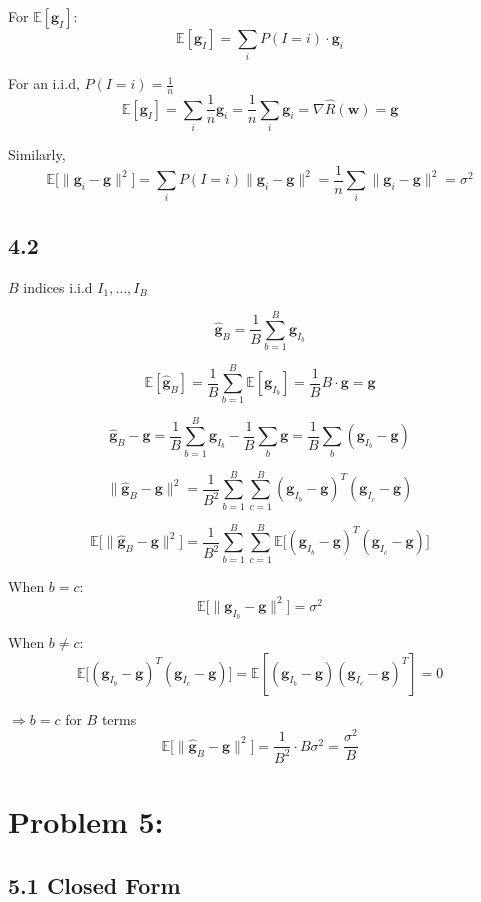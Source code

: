 \documentclass{article}
\begin{document}
For $\mathbb{E}[\mathbf{g}_I]$:
\[
\mathbb{E}[\mathbf{g}_I] = \sum_i P(I=i) \cdot \mathbf{g}_i
\]

For an i.i.d, $P(I=i) = \frac{1}{n}$
\[
\mathbb{E}[\mathbf{g}_I] = \sum_i \frac{1}{n} \mathbf{g}_i = \frac{1}{n}\sum_i \mathbf{g}_i = \nabla \hat{R}(\mathbf{w}) = \mathbf{g}
\]

Similarly,
\[
\mathbb{E}\big[\|\mathbf{g}_i - \mathbf{g}\|^2\big] = \sum_i P(I=i) \|\mathbf{g}_i - \mathbf{g}\|^2 = \frac{1}{n}\sum_i \|\mathbf{g}_i - \mathbf{g}\|^2 = \sigma^2
\]

\subsection*{4.2}

$B$ indices i.i.d $I_1, \ldots, I_B$

\[
\hat{\mathbf{g}}_B = \frac{1}{B}\sum_{b=1}^B \mathbf{g}_{I_b}
\]

\[
\mathbb{E}[\hat{\mathbf{g}}_B] = \frac{1}{B}\sum_{b=1}^B \mathbb{E}[\mathbf{g}_{I_b}] = \frac{1}{B} B \cdot \mathbf{g} = \mathbf{g}
\]

\[
\hat{\mathbf{g}}_B - \mathbf{g} = \frac{1}{B}\sum_{b=1}^B \mathbf{g}_{I_b} - \frac{1}{B}\sum_b \mathbf{g} = \frac{1}{B}\sum_b (\mathbf{g}_{I_b} - \mathbf{g})
\]

\[
\|\hat{\mathbf{g}}_B - \mathbf{g}\|^2 = \frac{1}{B^2}\sum_{b=1}^B \sum_{c=1}^B (\mathbf{g}_{I_b} - \mathbf{g})^T (\mathbf{g}_{I_c} - \mathbf{g})
\]

\[
\mathbb{E}\big[\|\hat{\mathbf{g}}_B - \mathbf{g}\|^2\big] = \frac{1}{B^2}\sum_{b=1}^B \sum_{c=1}^B \mathbb{E}\big[(\mathbf{g}_{I_b} - \mathbf{g})^T (\mathbf{g}_{I_c} - \mathbf{g})\big]
\]

When $b = c$:
\[
\mathbb{E}\big[\|\mathbf{g}_{I_b} - \mathbf{g}\|^2\big] = \sigma^2
\]

When $b \ne c$:
\[
\mathbb{E}\big[(\mathbf{g}_{I_b} - \mathbf{g})^T (\mathbf{g}_{I_c} - \mathbf{g})\big] = \mathbb{E}[(\mathbf{g}_{I_b} - \mathbf{g})(\mathbf{g}_{I_c} - \mathbf{g})^T] = 0
\]

$\Rightarrow b = c$ for $B$ terms
\[
\mathbb{E}\big[\|\hat{\mathbf{g}}_B - \mathbf{g}\|^2\big] = \frac{1}{B^2} \cdot B \sigma^2 = \frac{\sigma^2}{B}
\]

\section*{Problem 5:}
\subsection*{5.1 Closed Form}
\end{document}
